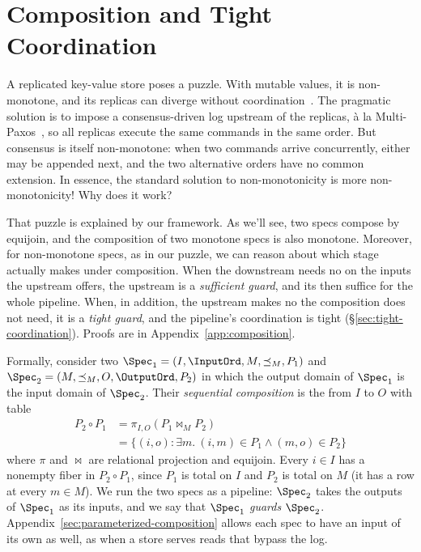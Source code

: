 \section{Composition and Tight Coordination}
\label{sec:composition}

A replicated key-value store poses a puzzle.  With mutable values, it is
non-monotone, and its replicas can diverge without coordination~\cite{alvaro2011bloom}. The pragmatic solution is
to impose a consensus-driven log upstream of the replicas, \`a la
Multi-Paxos~\cite{lamport2001paxos}, so all replicas execute the same commands
in the same order. But consensus is itself non-monotone: when two commands
arrive concurrently, either may be appended next, and the two alternative orders
have no common extension.  In essence, the standard solution to non-monotonicity
is more non-monotonicity! Why does it work?

That puzzle is explained by our framework.  As we'll see, two specs compose by equijoin,
and the composition of two monotone specs is also monotone. Moreover, for non-monotone specs,
as in our puzzle, we
can reason about which stage actually makes \commitments under composition.  When the
downstream needs no \commitment on the inputs the upstream offers, the
upstream is a \emph{sufficient guard}, and its \commitments then suffice for
the whole pipeline.  When, in addition, the upstream makes no \commitment the
composition does not need, it is a \emph{tight guard}, and the pipeline's
coordination is tight (\S\ref{sec:tight-coordination}).  Proofs are in
Appendix~\ref{app:composition}.
\label{sec:sequential-composition}

Formally, consider two \spectype[s]
${\Spec_1=(I,\InputOrd,M,\preceq_M,P_1)}$ and
${\Spec_2=(M,\preceq_M,O,\OutputOrd,P_2)}$
in which the output domain of $\Spec_1$ is the input domain of $\Spec_2$.  Their
\emph{sequential composition} is the \spectype from $I$ to $O$ with table
\begin{equation}
\begin{split}
  P_2\circ P_1
  &=\pi_{I,O}(P_1\Join_M P_2)\\
  &=\{(i,o):\exists m.\ (i,m)\in P_1\land(m,o)\in P_2\}
\end{split}
  \label{eq:spec-composition}
\end{equation}
where $\pi$ and $\Join$ are relational projection and equijoin.  Every $i\in I$
has a nonempty fiber in $P_2\circ P_1$, since $P_1$ is total on $I$ and $P_2$ is
total on $M$ (it has a row at every $m\in M$).  We run the two specs as a pipeline: $\Spec_2$ takes the outputs of $\Spec_1$ as
its inputs, and we say that $\Spec_1$ \emph{guards} $\Spec_2$.
Appendix~\ref{sec:parameterized-composition} allows each spec to have an input
of its own as well, as when a store serves reads that bypass the log.

